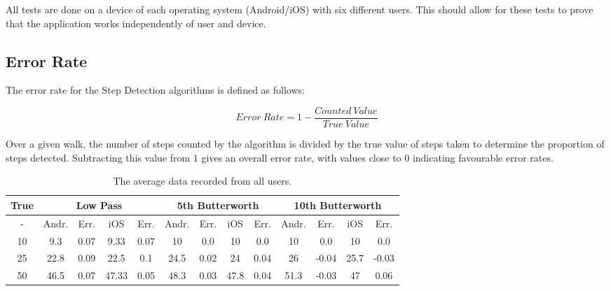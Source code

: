 \documentclass[12pt,a4paper]{report}
\begin{document}
All tests are done on a device of each operating system (Android/iOS) with six different users. This should allow for these tests to prove that the application works independently of user and device.

\subsection{Error Rate}

The error rate for the Step Detection algorithms is defined as follows:

\begin{equation}
Error\ Rate = 1 - \frac{Counted\ Value}{True\ Value}
\end{equation}

Over a given walk, the number of steps counted by the algorithm is divided by the true value of steps taken to determine the proportion of steps detected. Subtracting this value from 1 gives an overall error rate, with values close to 0 indicating favourable error rates.



\begin{table}[ht]
	\begin{tabular}{| c || c | c | c | c | c | c | c | c | c | c | c | c |}
		\hline
		True & \multicolumn{4}{c}{Low Pass} & \multicolumn{4}{|c|}{5th Butterworth} & \multicolumn{4}{c|}{10th Butterworth} \\
		\hline
		 - & Andr. & Err. & iOS & Err. & Andr. & Err. & iOS & Err. & Andr. & Err. & iOS & Err.\\
		\hline
		10 & 9.3 & 0.07 & 9.33 & 0.07 & 10 & 0.0 & 10 & 0.0 & 10 & 0.0 & 10 & 0.0 \\ 		
		25 & 22.8 & 0.09 & 22.5 & 0.1 & 24.5 & 0.02 & 24 & 0.04 & 26 & -0.04 & 25.7 & -0.03 \\ 	
		50 & 46.5 & 0.07 & 47.33 & 0.05 & 48.3 & 0.03 & 47.8 & 0.04 & 51.3 & -0.03 & 47 & 0.06\\ 
		\hline	
	\end{tabular}
	\caption{The average data recorded from all users.}
\end{table}
\end{document}
